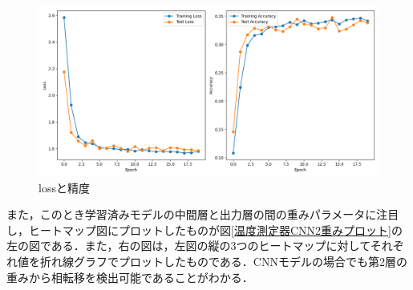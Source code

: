 \documentclass[a4paper,11pt]{jsreport}
\begin{document}
\begin{figure}[H]
  \begin{center}
      \includegraphics[width=\linewidth]{image/温度測定器2_L16_CNN_Nh3_loss.png}
      \caption{lossと精度}
      \label{温度測定器CNN2lossと精度}
  \end{center}
\end{figure}

また，このとき学習済みモデルの中間層と出力層の間の重みパラメータに注目し，ヒートマップ図にプロットしたものが図\ref{温度測定器CNN2重みプロット}の左の図である．また，右の図は，左図の縦の3つのヒートマップに対してそれぞれ値を折れ線グラフでプロットしたものである．CNNモデルの場合でも第2層の重みから相転移を検出可能であることがわかる．\par
\end{document}
